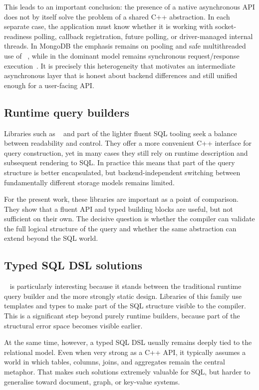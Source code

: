 This leads to an important conclusion: the presence of a native asynchronous API does not by itself solve the problem of a shared C++ abstraction. In each separate case, the application must know whether it is working with socket-readiness polling, callback registration, future polling, or driver-managed internal threads. In MongoDB the emphasis remains on pooling and safe multithreaded use of ~\cite{mongoc_client_pool}, while in  the dominant model remains synchronous request/response execution~\cite{libneo4j_client}. It is precisely this heterogeneity that motivates an intermediate asynchronous layer that is honest about backend differences and still unified enough for a user-facing API.

\subsection{Runtime query builders}

Libraries such as ~\cite{soci} and part of the lighter fluent SQL tooling seek a balance between readability and control. They offer a more convenient C++ interface for query construction, yet in many cases they still rely on runtime description and subsequent rendering to SQL. In practice this means that part of the query structure is better encapsulated, but backend-independent switching between fundamentally different storage models remains limited.

For the present work, these libraries are important as a point of comparison. They show that a fluent API and typed building blocks are useful, but not sufficient on their own. The decisive question is whether the compiler can validate the full logical structure of the query and whether the same abstraction can extend beyond the SQL world.

\subsection{Typed SQL DSL solutions}

~\cite{sqlpp11} is particularly interesting because it stands between the traditional runtime query builder and the more strongly static design. Libraries of this family use templates and types to make part of the SQL structure visible to the compiler. This is a significant step beyond purely runtime builders, because part of the structural error space becomes visible earlier.

At the same time, however, a typed SQL DSL usually remains deeply tied to the relational model. Even when very strong as a C++ API, it typically assumes a world in which tables, columns, joins, and aggregates remain the central metaphor. That makes such solutions extremely valuable for SQL, but harder to generalise toward document, graph, or key-value systems.

